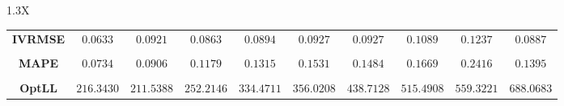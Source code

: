 \documentclass[10pt]{article}
\begin{document}
{\begin{tabularx}{1.3\textwidth}{X}
{\begin{tabular}{cccccccccc}
 { {\bf IVRMSE} }& $0.0633$ & $0.0921$ & $0.0863$ & $0.0894$ & $0.0927$ & $0.0927$ & $0.1089$& $0.1237$& $0.0887$ \\
\cmidrule(r){1-10} \\
 { {\bf MAPE} }& $0.0734$ & $0.0906$ & $0.1179$ & $0.1315$ & $0.1531$ & $0.1484$ & $0.1669$& $0.2416$& $0.1395$ \\
\cmidrule(r){1-10} \\
 { {\bf OptLL} }& $216.3430$ & $211.5388$ & $252.2146$ & $334.4711$ & $356.0208$ & $438.7128$ & $515.4908$& $559.3221$& $688.0683$ \\
\bottomrule
\end{tabular}}
\end{tabularx}}

  \vspace{3 cm}

  
\end{document}
